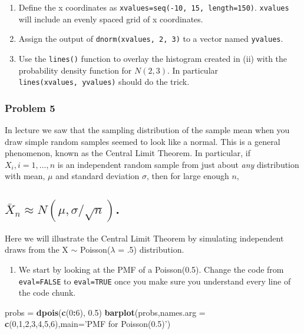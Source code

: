 \documentclass[]{article}
\newenvironment{Shaded}{\begin{snugshade}}{\end{snugshade}}
\newcommand{\DataTypeTok}[1]{\textcolor[rgb]{0.13,0.29,0.53}{#1}}
\newcommand{\DecValTok}[1]{\textcolor[rgb]{0.00,0.00,0.81}{#1}}
\newcommand{\FloatTok}[1]{\textcolor[rgb]{0.00,0.00,0.81}{#1}}
\newcommand{\KeywordTok}[1]{\textcolor[rgb]{0.13,0.29,0.53}{\textbf{#1}}}
\newcommand{\NormalTok}[1]{#1}
\newcommand{\OperatorTok}[1]{\textcolor[rgb]{0.81,0.36,0.00}{\textbf{#1}}}
\newcommand{\StringTok}[1]{\textcolor[rgb]{0.31,0.60,0.02}{#1}}
\providecommand{\tightlist}{%
  \setlength{\itemsep}{0pt}\setlength{\parskip}{0pt}}
\begin{document}
\begin{enumerate}
\def\labelenumi{\alph{enumi})}
\item
  Define the x coordinates as
  \texttt{xvalues=seq(-10,\ 15,\ length=150)}. \texttt{xvalues} will
  include an evenly spaced grid of x coordinates.
\item
  Assign the output of \texttt{dnorm(xvalues,\ 2,\ 3)} to a vector named
  \texttt{yvalues}.
\item
  Use the \texttt{lines()} function to overlay the histogram created in
  (ii) with the probability density function for \(N(2,3)\). In
  particular \texttt{lines(xvalues,\ yvalues)} should do the trick.
\end{enumerate}

\hypertarget{problem-5}{%
\subsubsection{Problem 5}\label{problem-5}}

In lecture we saw that the sampling distribution of the sample mean when
you draw simple random samples seemed to look like a normal. This is a
general phenomenon, known as the Central Limit Theorem. In particular,
if \(X_i, i = 1, \ldots, n\) is an independent random sample from just
about \emph{any} distribution with mean, \(\mu\) and standard deviation
\(\sigma\), then for large enough \(n\),

\hypertarget{bar-x_n-approx-nmu-sigmasqrtn.}{%
\subsection{\texorpdfstring{\(\bar X_n \approx N(\mu, \sigma/\sqrt{n})\).}{\textbackslash bar X\_n \textbackslash approx N(\textbackslash mu, \textbackslash sigma/\textbackslash sqrt\{n\}).}}\label{bar-x_n-approx-nmu-sigmasqrtn.}}

Here we will illustrate the Central Limit Theorem by simulating
independent draws from the X \(\sim\) Poisson(\(\lambda\) = .5)
distribution.

\begin{enumerate}
\def\labelenumi{\alph{enumi})}
\tightlist
\item
  We start by looking at the PMF of a Poisson(0.5). Change the code from
  \texttt{eval=FALSE} to \texttt{eval=TRUE} once you make sure you
  understand every line of the code chunk.
\end{enumerate}

\begin{Shaded}
\begin{Highlighting}[]
\NormalTok{probs =}\StringTok{ }\KeywordTok{dpois}\NormalTok{(}\KeywordTok{c}\NormalTok{(}\DecValTok{0}\OperatorTok{:}\DecValTok{6}\NormalTok{), }\FloatTok{0.5}\NormalTok{)}
\KeywordTok{barplot}\NormalTok{(probs,}\DataTypeTok{names.arg =} \KeywordTok{c}\NormalTok{(}\DecValTok{0}\NormalTok{,}\DecValTok{1}\NormalTok{,}\DecValTok{2}\NormalTok{,}\DecValTok{3}\NormalTok{,}\DecValTok{4}\NormalTok{,}\DecValTok{5}\NormalTok{,}\DecValTok{6}\NormalTok{),}\DataTypeTok{main=}\StringTok{'PMF for Poisson(0.5)'}\NormalTok{)}
\end{Highlighting}
\end{Shaded}
\end{document}
